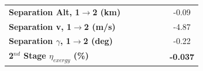 \begin{table}[ht!]
\begin{tabular}{l c c c c c c}
		\textbf{Separation Alt, 1$\rightarrow$2 (km)}
		& \firstsecondSeparationAltCdNinetyNoReturn
		& \firstsecondSeparationAltCdNinetyFiveNoReturn
		& \firstsecondSeparationAltCdStandardNoReturn
		& \firstsecondSeparationAltCdOneHundredFiveNoReturn
		& \firstsecondSeparationAltCdOneHundredTenNoReturn
		&-0.09
		\\
		\textbf{Separation v, 1$\rightarrow$2 (m/s)}
		& \firstsecondSeparationvCdNinetyNoReturn
		& \firstsecondSeparationvCdNinetyFiveNoReturn
		& \firstsecondSeparationvCdStandardNoReturn
		& \firstsecondSeparationvCdOneHundredFiveNoReturn
		& \firstsecondSeparationvCdOneHundredTenNoReturn
		&-4.87
		\\
		\textbf{Separation $\gamma$, 1$\rightarrow$2 (deg)}
		& \firstsecondSeparationgammaCdNinetyNoReturn
		& \firstsecondSeparationgammaCdNinetyFiveNoReturn
		& \firstsecondSeparationgammaCdStandardNoReturn
		& \firstsecondSeparationgammaCdOneHundredFiveNoReturn
		& \firstsecondSeparationgammaCdOneHundredTenNoReturn
		&-0.22
		\\
		\hline 
		\textbf{2$^{nd}$ Stage $\eta_{exergy}$ (\%)}
		& \textbf{\secondExergyEffCdNinetyNoReturn}
		& \textbf{\secondExergyEffCdNinetyFiveNoReturn}
		& \textbf{\secondExergyEffCdStandardNoReturn}
		& \textbf{\secondExergyEffCdOneHundredFiveNoReturn}
		& \textbf{\secondExergyEffCdOneHundredTenNoReturn}
		& \textbf{-0.037}
		\\
	

\end{tabular}
\end{table}
